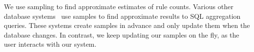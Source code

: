 
We use sampling to find approximate estimates of rule counts. Various other database systems~\cite{Acharya:1999:AAQ:304182.304581, Agarwal:2013:BQB:2465351.2465355} use samples to find approximate results to SQL aggregation queries. These systems create samples in advance and only update them when the database changes. In contrast, we keep updating our samples on the fly, as the user interacts with our system. 



